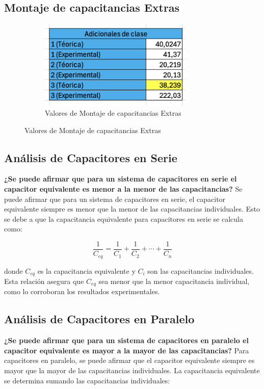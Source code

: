 \subsection{Montaje de capacitancias Extras}

\begin{figure}[H]
    \centering
    \begin{subfigure}[b]{\textwidth}
        \centering
        \includegraphics[width=0.8\textwidth]{Figures/1. Content/MontajeCapacitanciasExtra.png}
        \caption{Valores de Montaje de capacitancias Extras}
        \label{fig: Montaje de capacitancias Extras}
    \end{subfigure}
    \hfill
\end{figure}

\subsection{Análisis de Capacitores en Serie}
\textbf{¿Se puede afirmar que para un sistema de capacitores en serie el capacitor
equivalente es menor a la menor de las capacitancias?}
Se puede afirmar que para un sistema de capacitores en serie, el capacitor equivalente siempre es menor que la menor de las capacitancias individuales. Esto se debe a que la capacitancia equivalente para capacitores en serie se calcula como:

\[
\frac{1}{C_{eq}} = \frac{1}{C_1} + \frac{1}{C_2} + \cdots + \frac{1}{C_n}
\]

donde \( C_{eq} \) es la capacitancia equivalente y \( C_i \) son las capacitancias individuales. Esta relación asegura que \( C_{eq} \) sea menor que la menor capacitancia individual, como lo corroboran los resultados experimentales.

\subsection{Análisis de Capacitores en Paralelo}
\textbf{¿Se puede afirmar que para un sistema de capacitores en paralelo el capacitor
equivalente es mayor a la mayor de las capacitancias?}
Para capacitores en paralelo, se puede afirmar que el capacitor equivalente siempre es mayor que la mayor de las capacitancias individuales. La capacitancia equivalente se determina sumando las capacitancias individuales:

